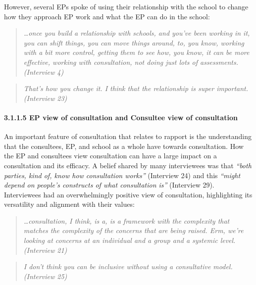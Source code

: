 \documentclass[
]{article}
\begin{document}
However, several EPs spoke of using their relationship with the school
to change how they approach EP work and what the EP can do in the
school:

\begin{quote}
\emph{\ldots once you build a relationship with schools, and you've been
working in it, you can shift things, you can move things around, to, you
know, working with a bit more control, getting them to see how, you
know, it can be more effective, working with consultation, not doing
just lots of assessments. (Interview 4)}
\end{quote}

\begin{quote}
\emph{That's how you change it. I think that the relationship is super
important. (Interview 23)}
\end{quote}

\hypertarget{ep-view-of-consultation-and-consultee-view-of-consultation}{%
\paragraph{3.1.1.5 EP view of consultation and Consultee view of
consultation}\label{ep-view-of-consultation-and-consultee-view-of-consultation}}

An important feature of consultation that relates to rapport is the
understanding that the consultees, EP, and school as a whole have
towards consultation. How the EP and consultees view consultation can
have a large impact on a consultation and its efficacy. A belief shared
by many interviewees was that \emph{``both parties, kind of, know how
consultation works''} (Interview 24) and this \emph{``might depend on
people's constructs of what consultation is''} (Interview 29).
Interviewees had an overwhelmingly positive view of consultation,
highlighting its versatility and alignment with their values:

\begin{quote}
\emph{\ldots consultation, I think, is a, is a framework with the
complexity that matches the complexity of the concerns that are being
raised. Erm, we're looking at concerns at an individual and a group and
a systemic level. (Interview 21)}
\end{quote}

\begin{quote}
\emph{I don't think you can be inclusive without using a consultative
model. (Interview 25)}
\end{quote}
\end{document}
